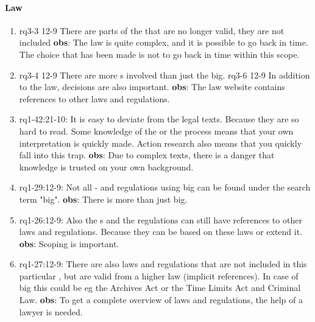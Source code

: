 \paragraph{Law}
\begin{enumerate}
    \item rq3-3 12-9 There are parts of the  that are no longer valid, they are not included
    \newline\textbf{obs}: The law is quite complex, and it is possible to go back in time.
    The choice that has been made is not to go back in time within this scope.

    \item rq3-4 12-9 There are more s involved than just the \acrshort{big}.
    \newline rq3-6 12-9 In addition to the law, decisions are also important.
    \newline\textbf{obs}: The law website contains references to other laws and regulations.

    \item rq1-42:21-10: It is easy to deviate from the legal texts.
    Because they are so hard to read.
    Some knowledge of the  or the process means that your own {interpretation} is quickly made.
    Action research also means that you quickly fall into this trap.
    \newline\textbf{obs}: Due to complex texts, there is a danger that knowledge is trusted on your own background.

    \item rq1-29:12-9: Not all - and regulations using \acrshort{big} can be found under the search term "big".
    \newline\textbf{obs}: There is more than just \acrshort{big}.

    \item rq1-26:12-9: Also the s and the regulations can still have {references} to other laws and regulations.
    Because they can be based on these laws or extend it.
    \newline\textbf{obs}: Scoping is important.
    
    \item rq1-27:12-9: There are also laws and regulations that are not included in this particular , but are valid from a higher law (implicit references).
    In case of \acrshort{big} this could be eg the Archives Act or the Time Limits Act and Criminal Law.
    \newline\textbf{obs}: To get a complete overview of laws and regulations, the help of a lawyer is needed.
    

\end{enumerate}
